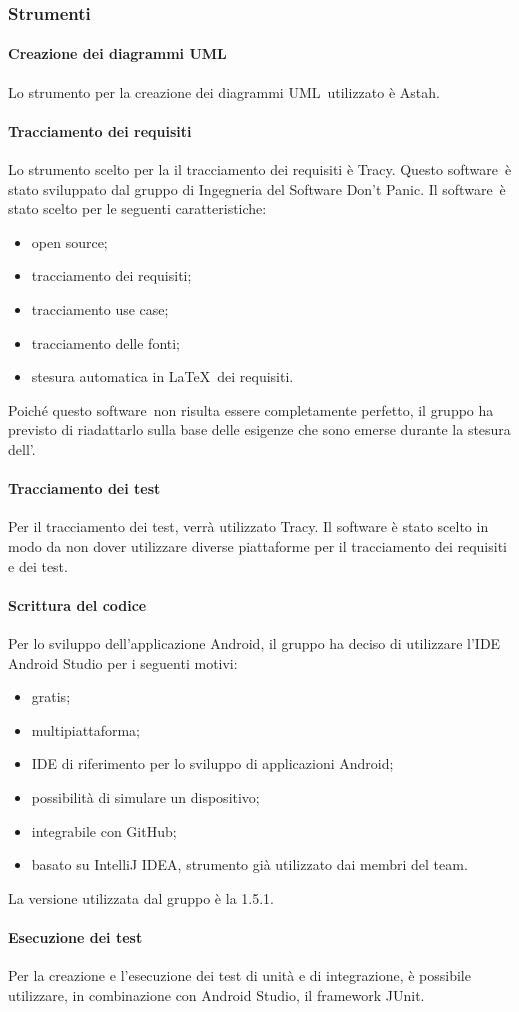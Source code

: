 \documentclass[../NormeProgetto.tex]{subfiles}
\begin{document}
		\subsubsection{Strumenti}
			\paragraph{Creazione dei diagrammi UML}
				Lo strumento per la creazione dei diagrammi UML\g\ utilizzato è Astah\g.
			\paragraph{Tracciamento dei requisiti}
				Lo strumento scelto per la il tracciamento dei requisiti è Tracy\g. Questo software\g\ è stato sviluppato dal gruppo di Ingegneria del Software Don't Panic. Il software\g\ è stato scelto per le seguenti caratteristiche:
			\begin{itemize}
				\item open source\g;
				\item tracciamento dei requisiti;
				\item tracciamento use case;
				\item tracciamento delle fonti;
				\item stesura automatica in \LaTeX\g\ dei requisiti.
			\end{itemize}
               Poiché questo software\g\ non risulta essere completamente perfetto, il gruppo ha previsto di riadattarlo sulla base delle esigenze che sono emerse durante la stesura dell'\analisideirequisiti .
 			\paragraph{Tracciamento dei test}
 				Per il tracciamento dei test, verrà utilizzato Tracy. Il software è stato scelto in modo da non dover utilizzare diverse piattaforme per il tracciamento dei requisiti e dei test.
			\paragraph{Scrittura del codice} 			
 				Per lo sviluppo dell'applicazione Android, il gruppo ha deciso di utilizzare l'IDE Android Studio per i seguenti motivi:
 				\begin{itemize}
 					\item gratis;
 					\item multipiattaforma;
 					\item IDE di riferimento per lo sviluppo di applicazioni Android;
 					\item possibilità di simulare un dispositivo;
 					\item integrabile con GitHub;
 					\item basato su IntelliJ IDEA, strumento già utilizzato dai membri del team.
 				\end{itemize}
 				La versione utilizzata dal gruppo è la 1.5.1.
 			\paragraph{Esecuzione dei test}
 				Per la creazione e l'esecuzione dei test di unità e di integrazione, è possibile utilizzare, in combinazione con Android Studio, il framework JUnit.
 			
			
\end{document}
